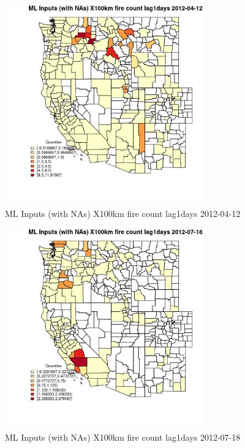 \begin{figure} 
\centering  
\includegraphics[width=0.77\textwidth]{Code_Outputs/Report_ML_input_PM25_Step4_part_e_de_duplicated_aves_compiled_2019-05-14wNAs_CountyX100km_fire_count_lag1daysMean2012-04-12_2012-04-12.jpg} 
\caption{\label{fig:Report_ML_input_PM25_Step4_part_e_de_duplicated_aves_compiled_2019-05-14wNAsCountyX100km_fire_count_lag1daysMean2012-04-12_2012-04-12}ML Inputs (with NAs) X100km fire count lag1days 2012-04-12} 
\end{figure} 
 

\begin{figure} 
\centering  
\includegraphics[width=0.77\textwidth]{Code_Outputs/Report_ML_input_PM25_Step4_part_e_de_duplicated_aves_compiled_2019-05-14wNAs_CountyX100km_fire_count_lag1daysMean2012-07-18_2012-07-18.jpg} 
\caption{\label{fig:Report_ML_input_PM25_Step4_part_e_de_duplicated_aves_compiled_2019-05-14wNAsCountyX100km_fire_count_lag1daysMean2012-07-18_2012-07-18}ML Inputs (with NAs) X100km fire count lag1days 2012-07-18} 
\end{figure} 
 

